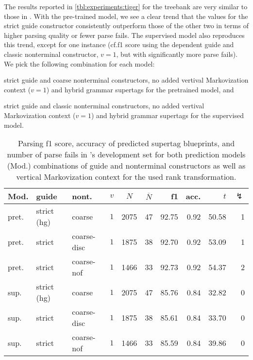 \documentclass[../../document.tex]{subfiles}
\begin{document}
    The results reported in \cref{tbl:experiments:tiger} for the \tiger{} treebank are very similar to those in \negra{}.
    With the pre-trained model, we see a clear trend that the values for the strict guide constructor consistently outperform those of the other two in terms of higher parsing quality or fewer parse fails.
    The supervised model also reproduces this trend, except for one instance (cf.\@ f1 score using the dependent guide and classic nonterminal constructor, $v=1$, but with significantly more parse fails).
    We pick the following combination for each model:
    \begin{compactitem}
        \item strict guide and coarse nonterminal constructors, no added vertival Markovization context ($v=1$) and hybrid grammar supertags for the pretrained model, and
        \item strict guide and classic nonterminal constructors, no added vertival Markovization context ($v=1$) and hybrid grammar supertags for the supervised model.
    \end{compactitem}

    \begin{table}
        \caption{\label{tbl:experiments:tiger:dcp}
        Parsing f1 score, accuracy of predicted  supertag blueprints, and number of parse fails in \tiger{}'s development set for both prediction models (Mod.) combinations of guide and nonterminal constructors as well as vertical Markovization context for the used rank transformation.
        }
        \centering
        \setlength{\tabcolsep}{4pt}
        \vspace{.2cm}
        \begin{tabular}{lllc|cc|rrrr}
            \toprule
Mod. &  guide &   nont.   &\(v\)  & $N$ & $\overline{N}$  & f1 & acc. & $t$ & $\lightning$ \\ \hline \rowcolor{black!10}
pret. & strict (hg) &  coarse & \(1\)     & 2075 & 47 & 92.75 & 0.92 & 50.58 & 1  \\\hline
pret. & strict    &  coarse-disc & \(1\)  & 1875 & 38 & 92.70 & 0.92 & 53.09 & 1  \\
pret. & strict     &  coarse-nof & \(1\)  & 1466 & 33 & 92.73 & 0.92 & 54.37 & 2  \\
\midrule \rowcolor{black!10}
sup. & strict (hg) &  coarse & \(1\)     & 2075 & 47 & 85.76 & 0.84 & 32.82 & 0  \\\hline
sup. & strict    &  coarse-disc & \(1\)  & 1875 & 38 & 85.61 & 0.84 & 33.70 & 0  \\
sup. & strict     &  coarse-nof & \(1\)  & 1466 & 33 & 85.59 & 0.84 & 39.86 & 0  \\
    \bottomrule
        \end{tabular}
    \end{table}
\end{document}
